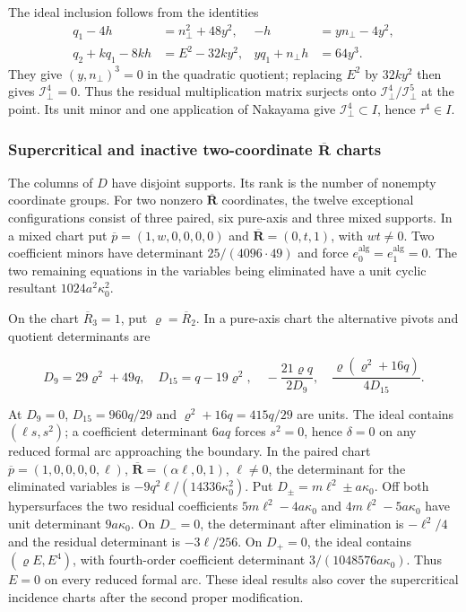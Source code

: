 \documentclass[11pt,a4paper]{article}
\numberwithin{equation}{section}
\theoremstyle{plain}
\theoremstyle{definition}
\theoremstyle{remark}
\begin{document}
The ideal inclusion follows from the identities
\begin{align*}
 q_1-4h&=n_\perp^2+48y^2,& -h&=yn_\perp-4y^2,\\
 q_2+kq_1-8kh&=E^2-32ky^2,& yq_1+n_\perp h&=64y^3.
\end{align*}
They give $(y,n_\perp)^3=0$ in the quadratic quotient; replacing $E^2$ by
$32ky^2$ then gives $\mathcal I_\perp^4=0$. Thus the residual multiplication
matrix surjects onto $\mathcal I_\perp^4/\mathcal I_\perp^5$ at the point. Its unit minor and one
application of Nakayama give $\mathcal I_\perp^4\subset I$, hence $\tau^4\in I$.

\subsubsection{Supercritical and inactive two-coordinate $\overline{\boldsymbol R}$ charts}

The columns of $D$ have disjoint supports. Its rank is the number of nonempty coordinate groups. For two nonzero $\overline{\boldsymbol R}$ coordinates, the twelve exceptional configurations consist of three paired, six pure-axis and three mixed supports. In a mixed chart put $\overline p=(1,w,0,0,0,0)$ and $\overline{\boldsymbol R}=(0,t,1)$, with $wt\ne0$. Two coefficient minors have determinant $25/(4096\cdot49)$ and force $e_0^{\mathrm{alg}}=e_1^{\mathrm{alg}}=0$. The two remaining equations in the variables being eliminated have a unit cyclic resultant $1024a^2\kappa_0 ^2$.

On the chart $\overline R_3=1$, put $\varrho=\overline R_2$.
In a pure-axis chart the alternative pivots and quotient determinants are

\begin{equation}D_9=29\varrho^2+49q,\quad D_{15}=q-19\varrho^2,\quad-\frac{21\varrho q}{2D_9},\quad\frac{\varrho(\varrho^2+16q)}{4D_{15}}.\end{equation}

At $D_9=0$, $D_{15}=960q/29$ and $\varrho^2+16q=415q/29$ are units. The ideal contains $(\ell s,s^2)$; a coefficient determinant $6aq$ forces $s^2=0$, hence $\delta=0$ on any reduced formal arc approaching the boundary. In the paired chart $\overline p=(1,0,0,0,0,\ell)$, $\overline{\boldsymbol R}=(\alpha\ell,0,1)$, $\ell\ne0$, the determinant for the eliminated variables is $-9q^2\ell/(14336\kappa_0 ^2)$. Put $D_\pm=m\ell^2\pm a\kappa_0 $. Off both hypersurfaces the two residual coefficients $5m\ell^2-4a\kappa_0 $ and $4m\ell^2-5a\kappa_0 $ have unit determinant $9a\kappa_0 $. On $D_-=0$, the determinant after elimination is $-\ell^2/4$ and the residual determinant is $-3\ell/256$. On $D_+=0$, the ideal contains $(\varrho E,E^4)$, with fourth-order coefficient determinant $3/(1048576a\kappa_0 )$. Thus $E=0$ on every reduced formal arc. These ideal results also cover the supercritical incidence charts after the second proper modification.
\end{document}

